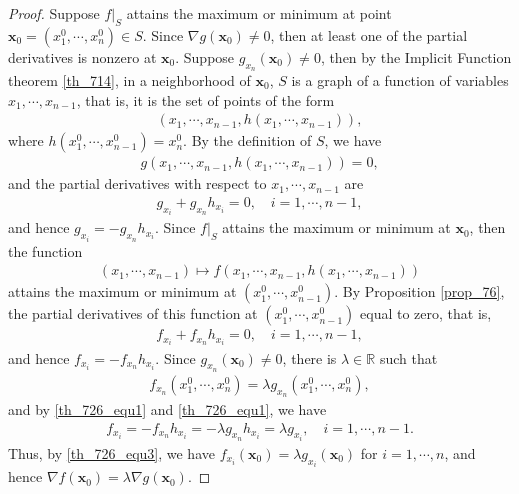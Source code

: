 \documentclass[11pt]{book}
\theoremstyle{definition}
\numberwithin{equation}{chapter}
\begin{document}
\begin{proof}
Suppose $f|_S$ attains the maximum or minimum at point $\mathbf{x}_0 = (x^0_1, \cdots, x^0_n) \in S$. Since $\nabla g(\mathbf{x}_0) \neq 0$, then at least one of the partial derivatives is nonzero at $\mathbf{x}_0$. Suppose $g_{x_n}(\mathbf{x}_0) \neq 0$, then by the Implicit Function theorem \ref{th_714}, in a neighborhood of $\mathbf{x}_0$, $S$ is a graph of a function of variables $x_1, \cdots, x_{n-1}$, that is, it is the set of points of the form
\begin{align*}
    \left(x_1, \cdots, x_{n-1}, h(x_1, \cdots, x_{n-1})\right),
\end{align*}
where $h(x^0_1, \cdots, x^0_{n-1}) = x^0_n$. By the definition of $S$, we have
\begin{align*}
    g\left(x_1, \cdots, x_{n-1}, h(x_1, \cdots, x_{n-1})\right) = 0,
\end{align*}
and the partial derivatives with respect to $x_1, \cdots, x_{n-1}$ are
\begin{align}\label{th_726_equ1}
    g_{x_i} + g_{x_n} h_{x_i} = 0, \quad i = 1, \cdots, n-1,
\end{align}
and hence $g_{x_i} = - g_{x_n} h_{x_i}$. Since $f|_S$ attains the maximum or minimum at $\mathbf{x}_0$, then the function
\begin{align*}
    (x_1, \cdots, x_{n-1}) \mapsto f\left(x_1, \cdots, x_{n-1}, h(x_1, \cdots, x_{n-1})\right)
\end{align*}
attains the maximum or minimum at $(x^0_1, \cdots, x^0_{n-1})$. By Proposition \ref{prop_76}, the partial derivatives of this function at $(x^0_1, \cdots, x^0_{n-1})$ equal to zero, that is,
\begin{align}\label{th_726_equ2}
    f_{x_i} + f_{x_n} h_{x_i} = 0, \quad i = 1, \cdots, n-1,
\end{align}
and hence $f_{x_i} = - f_{x_n} h_{x_i}$. Since $g_{x_n}(\mathbf{x}_0) \neq 0$, there is $\lambda \in \mathbb{R}$ such that
\begin{align}\label{th_726_equ3}
    f_{x_n}(x^0_1, \cdots, x^0_n) = \lambda g_{x_n}(x^0_1, \cdots, x^0_n),
\end{align}
and by \eqref{th_726_equ1} and \eqref{th_726_equ1}, we have
\begin{align*}
    f_{x_i} = - f_{x_n} h_{x_i} = - \lambda g_{x_n} h_{x_i} = \lambda g_{x_i}, \quad i = 1, \cdots, n-1.
\end{align*}
Thus, by \eqref{th_726_equ3}, we have $f_{x_i}(\mathbf{x}_0) = \lambda g_{x_i}(\mathbf{x}_0)$ for $i = 1,\cdots, n$, and hence $\nabla f(\mathbf{x}_0) = \lambda \nabla g(\mathbf{x}_0).$
\end{proof}
\end{document}
